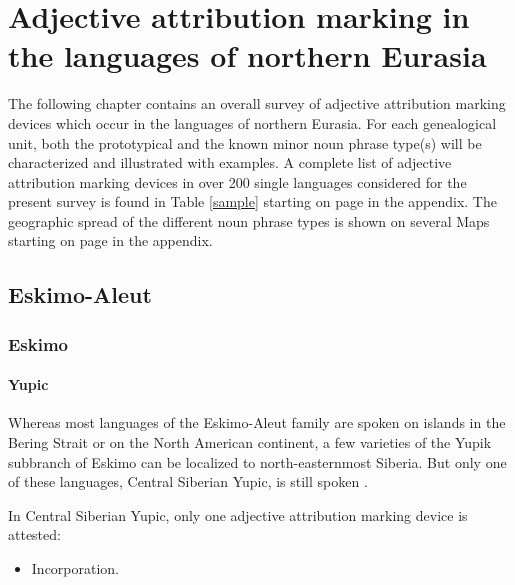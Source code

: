 
\chapter[The languages of northern Eurasia]{Adjective attribution marking in the languages of northern Eurasia}

The following chapter contains an overall survey of adjective attribution marking devices which occur in the languages of northern Eurasia. For each genealogical unit, both the prototypical and the known minor noun phrase type(s) will be characterized and illustrated with examples. A complete list of adjective attribution marking devices in over 200 single languages considered for the present survey is found in Table \ref{sample} starting on page \pageref{sample} in the appendix. The geographic spread of the different noun phrase types is shown on several Maps starting on page \pageref{WorldMap} in the appendix.

\section{Eskimo-Aleut}
\subsection{Eskimo}
\subsubsection{Yupic}
Whereas most languages of the Eskimo-Aleut family are spoken on islands in the Bering Strait or on the North American continent, a few varieties of the Yupik subbranch of Eskimo can be localized to north-easternmost Siberia. But only one of these languages, Central Siberian Yupic, is still spoken \cite[224]{salminen2007}.

In Central Siberian Yupic, only one adjective attribution marking device is attested:
\begin{itemize}
\item Incorporation.
\end{itemize}

